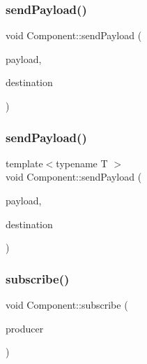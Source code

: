 \mbox{\label{classComponent_afc9525526fdc44c64873abf80357c3be}} 
\subsubsection{\texorpdfstring{send\+Payload()}{sendPayload()}\hspace{0.1cm}{\footnotesize\ttfamily [1/2]}}
{\footnotesize\ttfamily void Component\+::send\+Payload (\begin{DoxyParamCaption}\item[{std\+::string}]{payload,  }\item[{\hyperlink{structLogicalAddress}{Logical\+Address}}]{destination }\end{DoxyParamCaption})\hspace{0.3cm}{\ttfamily [inline]}}

\mbox{\label{classComponent_af7ee2839809098ffd50029375aa3e5a7}} 
\subsubsection{\texorpdfstring{send\+Payload()}{sendPayload()}\hspace{0.1cm}{\footnotesize\ttfamily [2/2]}}
{\footnotesize\ttfamily template$<$typename T $>$ \\
void Component\+::send\+Payload (\begin{DoxyParamCaption}\item[{T}]{payload,  }\item[{\hyperlink{structLogicalAddress}{Logical\+Address}}]{destination }\end{DoxyParamCaption})\hspace{0.3cm}{\ttfamily [inline]}}

\mbox{\label{classComponent_a55c74b1c2dcde114cb329ae43a4cd04a}} 
\subsubsection{\texorpdfstring{subscribe()}{subscribe()}\hspace{0.1cm}{\footnotesize\ttfamily [1/2]}}
{\footnotesize\ttfamily void Component\+::subscribe (\begin{DoxyParamCaption}\item[{\hyperlink{structLogicalAddress}{Logical\+Address}}]{producer }\end{DoxyParamCaption})\hspace{0.3cm}{\ttfamily [inline]}}

